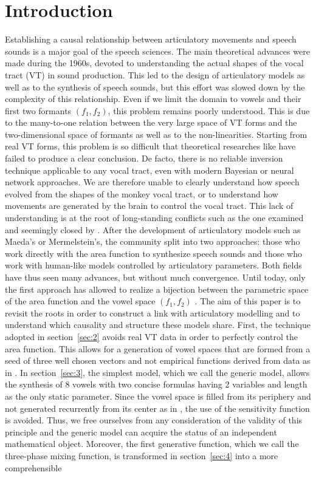 \documentclass[10pt,twocolumn]{article}
\let\cite\citep                             %
\begin{document}
\section{\label{sec:1} Introduction}
Establishing a causal relationship between articulatory movements and speech sounds is a major goal of the speech sciences. The main theoretical advances were made during the 1960s, devoted to understanding the actual shapes of the vocal tract (VT) in sound production. This led to the design of articulatory models as well as to the synthesis of speech sounds, but this effort was slowed down by the complexity of this relationship. Even if we limit the domain to vowels and their first two formants $(f_1,f_2)$, this problem remains poorly understood. This is due to the many-to-one relation between the very large space of VT forms and the two-dimensional space of formants as well as to the non-linearities. Starting from real VT forms, this problem is so difficult that theoretical researches like \cite{Heinz1967,Atal1978,YehiaItakura1996} have failed to produce a clear conclusion. De facto, there is no reliable inversion technique applicable to any vocal tract, even with modern Bayesian or neural network approaches. We are therefore unable to clearly understand how speech evolved from the shapes of the monkey vocal tract, or to understand how movements are generated by the brain to control the vocal tract. This lack of understanding is at the root of long-standing conflicts such as the one examined and seemingly closed by \cite{Boe2019}. After the development of articulatory models such as Maeda's or Mermelstein's, the community split into two approaches: those who work directly with the area function to synthesize speech sounds and those who work with human-like models controlled by articulatory parameters. Both fields have thus seen many advances, but without much convergence. Until today, only the first approach has allowed to realize a bijection between the parametric space of the area function and the vowel space $(f_1, f_2)$ \cite{Carre2009,Story2005}. The aim of this paper is to revisit the roots in order to construct a link with articulatory modelling and to understand which causality and structure these models share. First, the technique adopted in section~\ref{sec:2} avoids real VT data in order to perfectly control the area function. This allows for a generation of vowel spaces that are formed from a seed of three well chosen vectors and not empirical functions derived from data as in \cite{Story2005}. In section~\ref{sec:3}, the simplest model, which we call the generic model, allows the synthesis of 8 vowels with two concise formulas having 2 variables and length as the only static parameter. Since the vowel space is filled from its periphery and not generated recurrently from its center as in \cite{Carre2004,Carre2009}, the use of the sensitivity function \cite{FantPauli1974,Carre2004,Story2006} is avoided. Thus, we free ourselves from any consideration of the validity of this principle and the generic model can acquire the status of an independent mathematical object. Moreover, the first generative function, which we call the three-phase mixing function, is transformed in section~\ref{sec:4} into a more comprehensible 
\end{document}
